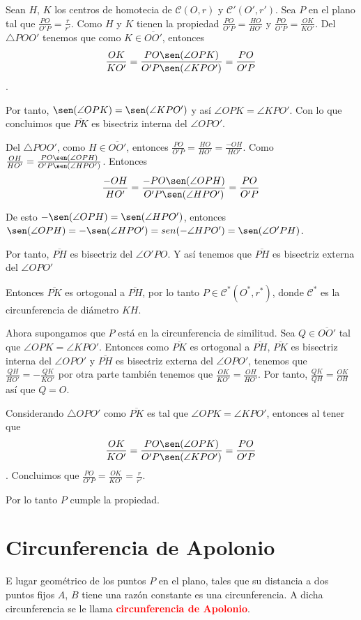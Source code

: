 \begin{dem}
Sean $H$, $K$ los centros de homotecia de $\mathcal{C}(O,r)$ y $\mathcal{C'}(O',r')$.
Sea $P$ en el plano tal que $\frac{PO}{O'P}=\frac{r}{r'}$. Como $H$ y $K$ tienen la propiedad $\frac{PO}{O'P}=\frac{HO}{HO'}$ y $\frac{PO}{O'P}=\frac{OK}{KO'}$.
Del $\triangle POO'$ tenemos que como $K\in\overline{OO'}$, entonces 
$$\frac{OK}{KO'}=\frac{PO \sen(\angle OPK)}{O'P \sen(\angle KPO')}=\frac{PO}{O'P}$$.

Por tanto, $\sen(\angle OPK)=\sen(\angle KPO')$ y así $\angle OPK=\angle KPO'$. Con lo que concluimos que $\overline{PK}$ es bisectriz interna del $\angle OPO'$.

Del $\triangle POO'$, como $H\in\overline{OO'}$, entonces $\frac{PO}{O'P}=\frac{HO}{HO'}=\frac{-OH}{HO'}$. Como $\frac{OH}{HO'}=\frac{PO \sen(\angle OPH)}{O'P \sen(\angle HPO')}$. Entonces
$$\frac{-OH}{HO'}=\frac{-PO \sen(\angle OPH)}{O'P \sen(\angle HPO')}=\frac{PO}{O'P}$$

De esto $-\sen(\angle OPH)=\sen(\angle HPO')$, entonces $\sen(\angle OPH)=-\sen(\angle HPO')=sen(-\angle HPO')=\sen(\angle O'PH)$.

Por tanto, $\overline{PH}$ es bisectriz del $\angle O'PO$. Y así tenemos que $\overline{PH}$ es bisectriz externa del $\angle OPO'$

Entonces $\overline{PK}$ es ortogonal a $\overline{PH}$, por lo tanto $P\in\mathcal{C^{*}}(O^{*},r^{*})$, donde $\mathcal{C^{*}}$ es la circunferencia de diámetro $KH$.

Ahora supongamos que $P$ está en la circunferencia de  similitud. Sea $Q\in\overline{OO'}$ tal que $\angle OPK=\angle KPO'$. Entonces como $\overline{PK}$ es ortogonal a $\overline{PH}$, $\overline{PK}$ es bisectriz interna del $\angle OPO'$ y $\overline{PH}$ es bisectriz externa del $\angle OPO'$, tenemos que $\frac{QH}{HO'}=-\frac{QK}{KO'}$ por otra parte también tenemos que $\frac{OK}{KO'}=\frac{OH}{HO'}$. Por tanto, $\frac{QK}{QH}=\frac{OK}{OH}$ así que $Q=O$.

Considerando $\triangle OPO'$ como $\overline{PK}$ es tal que $\angle OPK=\angle KPO'$, entonces al tener que $$\frac{OK}{KO'}=\frac{PO \sen(\angle OPK)}{O'P \sen(\angle KPO')}=\frac{PO}{O'P}$$. Concluimos que $\frac{PO}{O'P}=\frac{OK}{KO'}=\frac{r}{r'}$.

Por lo tanto $P$ cumple la propiedad. 
\end{dem}

\section{Circunferencia de Apolonio}
\begin{teo}
E lugar geométrico de los puntos $P$ en el plano, tales que su distancia a dos puntos fijos $A$, $B$ tiene una razón constante es una circunferencia. A dicha circunferencia se le llama \textcolor{red}{\bf circunferencia de Apolonio}.
\end{teo}

